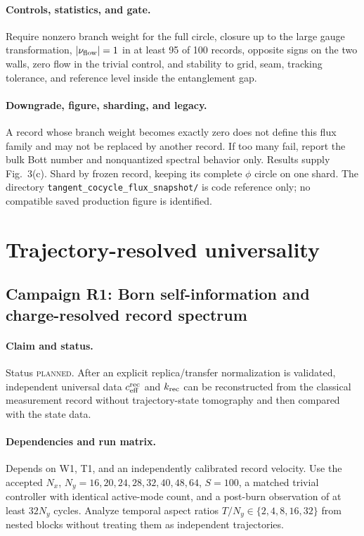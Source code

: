 \documentclass[aps,prx,onecolumn,nofootinbib,superscriptaddress,longbibliography]{revtex4-2}
\newcommand{\code}[1]{\texttt{#1}}
\newcommand{\planned}{\textsc{planned}}
\begin{document}
\paragraph{Controls, statistics, and gate.}
Require nonzero branch weight for the full circle, closure up to the large gauge
transformation, $|\nu_{\rm flow}|=1$ in at least 95 of 100 records, opposite signs on the
two walls, zero flow in the trivial control, and stability to grid, seam, tracking tolerance,
and reference level inside the entanglement gap.

\paragraph{Downgrade, figure, sharding, and legacy.}
A record whose branch weight becomes exactly zero does not define this flux family and may
not be replaced by another record.  If too many fail, report the bulk Bott number and
nonquantized spectral behavior only.  Results supply Fig.~3(c).  Shard by frozen record,
keeping its complete $\phi$ circle on one shard.  The directory
\code{tangent\_cocycle\_flux\_snapshot/} is code reference only; no compatible saved
production figure is identified.

\section{Trajectory-resolved universality}

\subsection{Campaign R1: Born self-information and charge-resolved record spectrum}
\paragraph{Claim and status.}
Status \planned.  After an explicit replica/transfer normalization is validated,
independent universal data $c_{\rm eff}^{\rm rec}$ and $k_{\rm rec}$ can be reconstructed
from the classical measurement record without trajectory-state tomography and then
compared with the state data.

\paragraph{Dependencies and run matrix.}
Depends on W1, T1, and an independently calibrated record velocity.  Use the accepted
$N_x$, $N_y=16,20,24,28,32,40,48,64$, $S=100$, a matched trivial controller with identical
active-mode count, and a post-burn observation of at least $32N_y$ cycles.  Analyze temporal
aspect ratios $T/N_y\in\{2,4,8,16,32\}$ from nested blocks without treating them as
independent trajectories.
\end{document}

